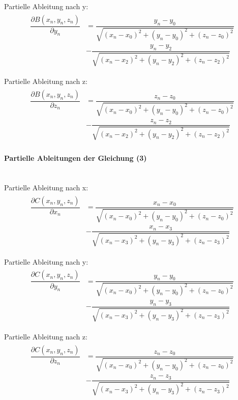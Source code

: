 Partielle Ableitung nach y:
\begin{align}
\begin{split}
\dfrac{\partial B(x_{n},y_{n},z_{n})}{\partial y_{n}} &= \dfrac{y_{n}-y_{0}}{\sqrt{(x_{n}-x_{0})^{2}+ (y_{n}-y_{0})^{2}+(z_{n}-z_{0})^{2}}} \\ & - \dfrac{y_{n}-y_{2}}{\sqrt{(x_{n}-x_{2})^{2}+ (y_{n}-y_{2})^{2}+(z_{n}-z_{2})^{2}}}
\end{split}
\end{align}

Partielle Ableitung nach z:
\begin{align}
\begin{split}
\dfrac{\partial B(x_{n},y_{n},z_{n})}{\partial z_{n}} &= \dfrac{z_{n}-z_{0}}{\sqrt{(x_{n}-x_{0})^{2}+ (y_{n}-y_{0})^{2}+(z_{n}-z_{0})^{2}}} \\ & - \dfrac{z_{n}-z_{2}}{\sqrt{(x_{n}-x_{2})^{2}+ (y_{n}-y_{2})^{2}+(z_{n}-z_{2})^{2}}}
\end{split}
\end{align}
\paragraph{Partielle Ableitungen der Gleichung (3)}\ \\

Partielle Ableitung nach x:
\begin{align}
\begin{split}
\dfrac{\partial C(x_{n},y_{n},z_{n})}{\partial x_{n}} &= \dfrac{x_{n}-x_{0}}{\sqrt{(x_{n}-x_{0})^{2}+ (y_{n}-y_{0})^{2}+(z_{n}-z_{0})^{2}}} \\ & - \dfrac{x_{n}-x_{3}}{\sqrt{(x_{n}-x_{3})^{2}+ (y_{n}-y_{3})^{2}+(z_{n}-z_{3})^{2}}}
\end{split}
\end{align}

Partielle Ableitung nach y:
\begin{align}
\begin{split}
\dfrac{\partial C(x_{n},y_{n},z_{n})}{\partial y_{n}} &= \dfrac{y_{n}-y_{0}}{\sqrt{(x_{n}-x_{0})^{2}+ (y_{n}-y_{0})^{2}+(z_{n}-z_{0})^{2}}} \\ & - \dfrac{y_{n}-y_{3}}{\sqrt{(x_{n}-x_{3})^{2}+ (y_{n}-y_{3})^{2}+(z_{n}-z_{3})^{2}}}
\end{split}
\end{align}

Partielle Ableitung nach z:
\begin{align}
\begin{split}
\dfrac{\partial C(x_{n},y_{n},z_{n})}{\partial z_{n}} &= \dfrac{z_{n}-z_{0}}{\sqrt{(x_{n}-x_{0})^{2}+ (y_{n}-y_{0})^{2}+(z_{n}-z_{0})^{2}}} \\ & - \dfrac{z_{n}-z_{3}}{\sqrt{(x_{n}-x_{3})^{2}+ (y_{n}-y_{3})^{2}+(z_{n}-z_{3})^{2}}}
\end{split}
\end{align}


